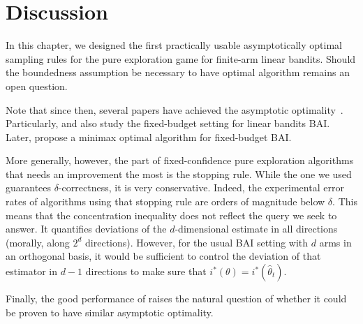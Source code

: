 \section{Discussion}\label{sec:lgc.discussion}

In this chapter, we designed the first practically usable asymptotically optimal sampling rules for the pure exploration game for finite-arm linear bandits. Should the boundedness assumption be necessary to have optimal algorithm remains an open question.

Note that since then, several papers have achieved the asymptotic optimality~\citep{zaki2020linear,jedra2020linear,katz-samuels2020practical}. Particularly, \cite{jedra2020linear} and \cite{katz-samuels2020practical} also study the fixed-budget setting for linear bandits BAI. Later, \cite{yang2021linear} propose a minimax optimal algorithm for fixed-budget BAI.

More generally, however, the part of fixed-confidence pure exploration algorithms that needs an improvement the most is the stopping rule. While the one we used guarantees $\delta$-correctness, it is very conservative. Indeed, the experimental error rates of algorithms using that stopping rule are orders of magnitude below $\delta$. This means that the concentration inequality does not reflect the query we seek to answer. It quantifies deviations of the $d$-dimensional estimate in all directions (morally, along $2^d$ directions). However, for the usual BAI setting with $d$ arms in an orthogonal basis, it would be sufficient to control the deviation of that estimator in $d-1$ directions to make sure that $i^*(\theta) = i^*(\hat{\theta}_t)$.

Finally, the good performance of \LGapE raises the natural question of whether it could be proven to have similar asymptotic optimality.

